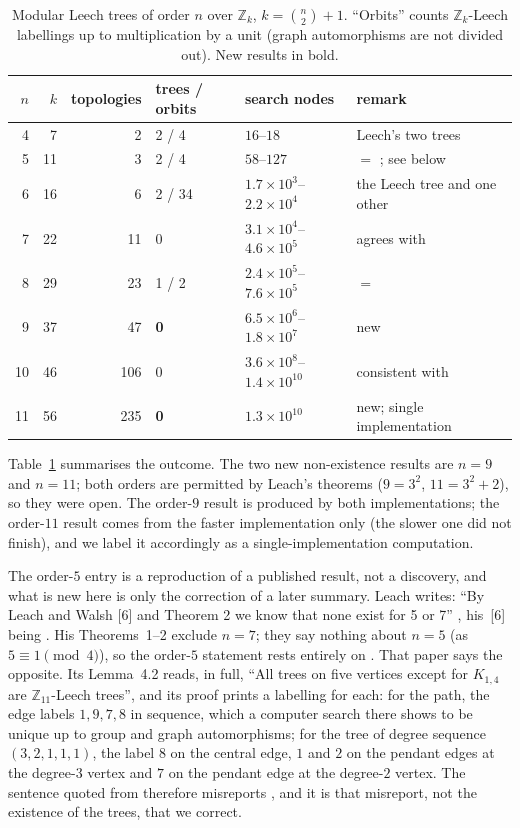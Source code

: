 \documentclass[11pt,a4paper]{article}
\theoremstyle{plain}
\theoremstyle{remark}
\newcommand{\Z}{\mathbb{Z}}
\newcommand{\bin}[2]{\binom{#1}{#2}}
\begin{document}
\begin{table}[ht]
\centering
\caption{Modular Leech trees of order $n$ over $\Z_k$, $k=\bin n2+1$.  ``Orbits''
counts $\Z_k$-Leech labellings up to multiplication by a unit (graph
automorphisms are not divided out).  New results in bold.}
\label{tab:modular}
\small
\begin{tabular}{@{}rrrlll@{}}
\toprule
$n$ & $k$ & topologies & trees / orbits & search nodes & remark\\
\midrule
4  & 7  & 2   & 2 / 4          & $16$--$18$ & Leech's two trees\\
5  & 11 & 3   & 2 / 4          & $58$--$127$ & $=$ \cite[Lem.~4.2]{LeachWalsh2011}; see below\\
6  & 16 & 6   & 2 / 34         & $1.7\times10^3$--$2.2\times10^4$ & the Leech tree and one other\\
7  & 22 & 11  & 0              & $3.1\times10^4$--$4.6\times10^5$ & agrees with \cite[Thm.~2]{Leach2014}\\
8  & 29 & 23  & 1 / 2          & $2.4\times10^5$--$7.6\times10^5$ & $=$ \cite{Leach2014}\\
9  & 37 & 47  & \textbf{0}     & $6.5\times10^6$--$1.8\times10^7$ & new\\
10 & 46 & 106 & 0              & $3.6\times10^8$--$1.4\times10^{10}$ & consistent with \cite[Thm.~1]{Leach2014}\\
11 & 56 & 235 & \textbf{0}     & $1.3\times10^{10}$ & new; single implementation\\
\bottomrule
\end{tabular}
\end{table}

Table~\ref{tab:modular} summarises the outcome.  The two new non-existence
results are $n=9$ and $n=11$; both orders are permitted by Leach's theorems
($9=3^2$, $11=3^2+2$), so they were open.  The order-$9$ result is produced by
both implementations; the order-$11$ result comes from the faster implementation
only (the slower one did not finish), and we label it accordingly as a
single-implementation computation.

The order-$5$ entry is a reproduction of a published result, not a discovery,
and what is new here is only the correction of a later summary.  Leach writes:
``By Leach and Walsh [6] and Theorem 2 we know that none exist for 5 or 7''
\cite[p.~2]{Leach2014}, his~[6] being \cite{LeachWalsh2011}.  His
Theorems~1--2 exclude $n=7$; they say nothing about $n=5$ (as $5\equiv1\pmod4$),
so the order-$5$ statement rests entirely on \cite{LeachWalsh2011}.  That paper
says the opposite.  Its Lemma~4.2 reads, in full, ``All trees on five vertices
except for $K_{1,4}$ are $\Z_{11}$-Leech trees'', and its proof prints a
labelling for each: for the path, the edge labels $1,9,7,8$ in sequence, which a
computer search there shows to be unique up to group and graph automorphisms;
for the tree of degree sequence $(3,2,1,1,1)$, the label $8$ on the central
edge, $1$ and $2$ on the pendant edges at the degree-$3$ vertex and $7$ on the
pendant edge at the degree-$2$ vertex.  The sentence quoted from
\cite{Leach2014} therefore misreports \cite{LeachWalsh2011}, and it is that
misreport, not the existence of the trees, that we correct.
\end{document}
